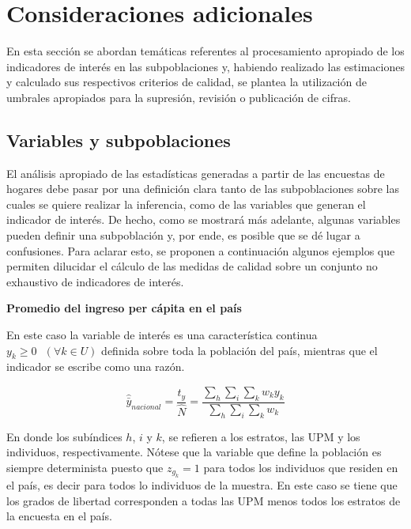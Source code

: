 \documentclass[
  10pt,
  spanish,
]{book}
\begin{document}
\hypertarget{consideraciones-adicionales-1}{%
\section{Consideraciones adicionales}\label{consideraciones-adicionales-1}}

En esta sección se abordan temáticas referentes al procesamiento apropiado de los indicadores de interés en las subpoblaciones y, habiendo realizado las estimaciones y calculado sus respectivos criterios de calidad, se plantea la utilización de umbrales apropiados para la supresión, revisión o publicación de cifras.

\hypertarget{variables-y-subpoblaciones}{%
\subsection{Variables y subpoblaciones}\label{variables-y-subpoblaciones}}

El análisis apropiado de las estadísticas generadas a partir de las encuestas de hogares debe pasar por una definición clara tanto de las subpoblaciones sobre las cuales se quiere realizar la inferencia, como de las variables que generan el indicador de interés. De hecho, como se mostrará más adelante, algunas variables pueden definir una subpoblación y, por ende, es posible que se dé lugar a confusiones. Para aclarar esto, se proponen a continuación algunos ejemplos que permiten dilucidar el cálculo de las medidas de calidad sobre un conjunto no exhaustivo de indicadores de interés.

\textbf{Promedio del ingreso per cápita en el país}

En este caso la variable de interés es una característica continua \(y_k \geq 0 \ \ \ (\forall k \in U)\) definida sobre toda la población del país, mientras que el indicador se escribe como una razón.

\[
\hat {\bar y}_{nacional} = \frac{\hat t_y}{\hat N} =\frac{\sum_h\sum_i\sum_k w_ky_{k}}{\sum_h\sum_i\sum_k w_k}
\]

En donde los subíndices \(h\), \(i\) y \(k\), se refieren a los estratos, las UPM y los individuos, respectivamente. Nótese que la variable que define la población es siempre determinista puesto que \(z_{g_k} = 1\) para todos los individuos que residen en el país, es decir para todos lo individuos de la muestra. En este caso se tiene que los grados de libertad corresponden a todas las UPM menos todos los estratos de la encuesta en el país.
\end{document}
